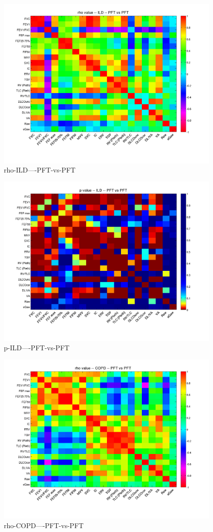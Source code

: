 \documentclass[12pt]{article}
\begin{document}
\clearpage
\begin{figure}
    \includegraphics[width=0.84\linewidth,viewport=100 60 620 550]{corr/rho-ILD----PFT-vs-PFT.png}
    \caption{rho-ILD----PFT-vs-PFT}
    \label{fig:rho-ILD----PFT-vs-PFT}
\end{figure}
\begin{figure}
    \includegraphics[width=0.84\linewidth,viewport=100 60 620 550]{corr/p-ILD----PFT-vs-PFT.png}
    \caption{p-ILD----PFT-vs-PFT}
    \label{fig:p-ILD----PFT-vs-PFT}
\end{figure}
\begin{figure}
    \includegraphics[width=0.84\linewidth,viewport=100 60 620 550]{corr/rho-COPD----PFT-vs-PFT.png}
    \caption{rho-COPD----PFT-vs-PFT}
    \label{fig:rho-COPD----PFT-vs-PFT}
\end{figure}
\end{document}
